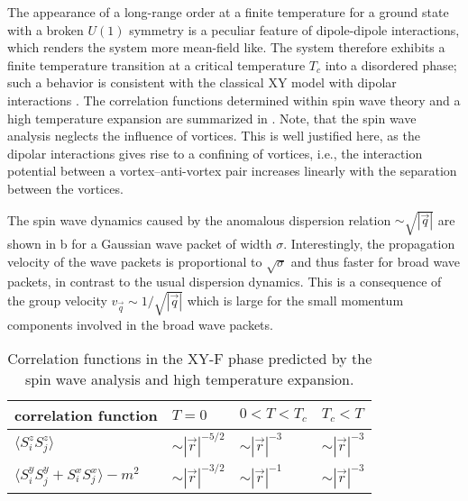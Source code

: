 The appearance of a long-range order at a finite temperature for a ground state with a broken $U(1)$ symmetry is
a peculiar feature of dipole-dipole interactions, which renders the system more mean-field like. The system therefore
exhibits a finite temperature transition at a critical temperature $T_{c}$ into a disordered phase; such a behavior is
consistent with the classical XY model with dipolar interactions \cite{Bruno2001}. The correlation functions determined
within spin wave theory and a high temperature expansion are summarized in .
 Note, that the spin wave analysis neglects the influence of vortices. This is well justified here,
as the dipolar interactions gives rise to a confining of vortices, i.e., the interaction potential
between a vortex--anti-vortex pair increases linearly with the separation between the vortices.

The spin wave dynamics caused by the anomalous dispersion relation $\sim \sqrt{|{\vec q}|}$ are shown in b for a Gaussian wave packet of width $\sigma$. Interestingly, the propagation velocity of the wave packets is proportional to $\sqrt{\sigma}$ and thus faster for broad wave packets, in contrast to the usual dispersion dynamics. This is a consequence of the group velocity $v_{\vec q} \sim 1/\sqrt{|{\vec q}|}$ which is large for the small momentum components involved in the broad wave packets.

\begin{table}
    \centering
    \begin{tabu} to .8\textwidth {X[1.8]X[c]X[c]X[c]}
        \toprule
        correlation function & $T=0$ & $0 < T < T_{c}$ & $T_{c}< T$ \\
        \midrule
        $ \langle S^{z}_{i} S^{z}_{j}\rangle$  &$ \sim |{\vec r}|^{-5/2}$  & $\sim |{\vec r}|^{-3}$ &  $\sim |{\vec r}|^{-3}$ \\
        $ \langle S^{y}_{i} S^{y}_{j}+ S^{x}_{i} S^{x}_{j}\rangle- m^2$  &$ \sim |{\vec r}|^{-3/2}$ &  $\sim |{\vec r}|^{-1}$ &  $\sim |{\vec r}|^{-3}$ \\
        \bottomrule
    \end{tabu}
    \caption{Correlation functions in the XY-F phase predicted by the spin wave analysis and high temperature expansion.}
\end{table}


